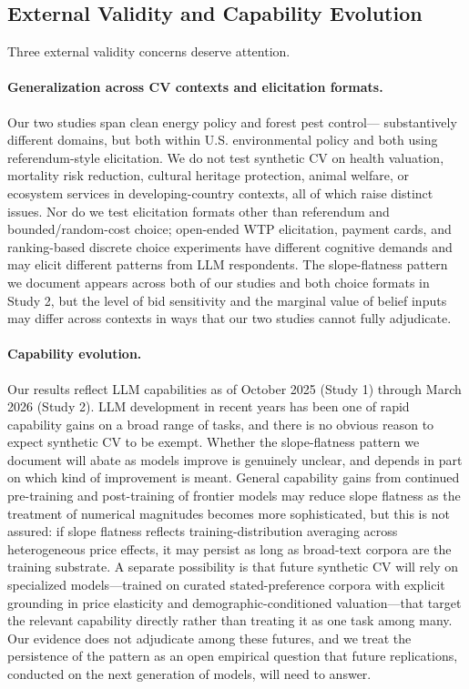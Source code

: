 \documentclass[12pt]{article}
\begin{document}
\subsection{External Validity and Capability Evolution}\label{sec:disc-external-validity}

Three external validity concerns deserve attention.

\paragraph{Generalization across CV contexts and elicitation formats.}
Our two studies span clean energy policy and forest pest control---
substantively different domains, but both within U.S. environmental
policy and both using referendum-style elicitation. We do not test
synthetic CV on health valuation, mortality risk reduction, cultural
heritage protection, animal welfare, or ecosystem services in
developing-country contexts, all of which raise distinct issues. Nor do
we test elicitation formats other than referendum and bounded/random-cost
choice; open-ended WTP elicitation, payment cards, and ranking-based
discrete choice experiments have different cognitive demands and may
elicit different patterns from LLM respondents. The slope-flatness
pattern we document appears across both of our studies and both choice
formats in Study 2, but the level of bid sensitivity and the marginal
value of belief inputs may differ across contexts in ways that our two
studies cannot fully adjudicate.

\paragraph{Capability evolution.} Our results reflect LLM capabilities as of October 2025 (Study 1) through March 2026 (Study 2). LLM development in recent years has been one of rapid capability gains on a broad range of tasks, and there is no obvious reason to expect synthetic CV to be exempt. Whether the slope-flatness pattern we document will abate as
models improve is genuinely unclear, and depends in part on which kind
of improvement is meant. General capability gains from continued
pre-training and post-training of frontier models may reduce slope
flatness as the treatment of numerical magnitudes becomes more
sophisticated, but this is not assured: if slope flatness reflects
training-distribution averaging across heterogeneous price effects, it
may persist as long as broad-text corpora are the training substrate.
A separate possibility is that future synthetic CV will rely on
specialized models---trained on curated stated-preference corpora with
explicit grounding in price elasticity and demographic-conditioned
valuation---that target the relevant capability directly rather than
treating it as one task among many. Our evidence does not adjudicate
among these futures, and we treat the persistence of the pattern as an
open empirical question that future replications, conducted on the next
generation of models, will need to answer.
\end{document}
